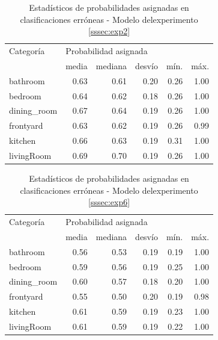 \begin{table}[h!]
	\centering
	\begin{tabular}{| l | rrrrr| }
		\toprule
		Categoría & \multicolumn{5}{l}{Probabilidad asignada} \\
		&         media & mediana &   desvío &   mín. &   máx. \\
		\midrule
		bathroom &         0.63 &   0.61 &  0.20 &  0.26 &  1.00 \\
		bedroom &         0.64 &   0.62 &  0.18 &  0.26 &  1.00 \\
		dining\_room &         0.67 &   0.64 &  0.19 &  0.26 &  1.00 \\
		frontyard &         0.63 &   0.62 &  0.19 &  0.26 &  0.99 \\
		kitchen &         0.66 &   0.63 &  0.19 &  0.31 &  1.00 \\
		livingRoom &         0.69 &   0.70 &  0.19 &  0.26 &  1.00 \\
		\bottomrule
	\end{tabular}
	\caption{Estadísticos de probabilidades asignadas en clasificaciones erróneas - Modelo delexperimento \ref{sssec:exp2}}
	\label{conclusiones:error_analysis_pred_proba_stats:exp2}
\end{table}

\begin{table}[h!]
	\centering
	\begin{tabular}{| l | rrrrr | }
		\toprule
		Categoría & \multicolumn{5}{l}{Probabilidad asignada} \\
		&         media & mediana &   desvío &   mín. &   máx. \\
		\midrule
		bathroom &         0.56 &   0.53 &  0.19 &  0.19 &  1.00 \\
		bedroom &         0.59 &   0.56 &  0.19 &  0.25 &  1.00 \\
		dining\_room &         0.60 &   0.57 &  0.18 &  0.20 &  1.00 \\
		frontyard &         0.55 &   0.50 &  0.20 &  0.19 &  0.98 \\
		kitchen &         0.61 &   0.59 &  0.19 &  0.23 &  1.00 \\
		livingRoom &         0.61 &   0.59 &  0.19 &  0.22 &  1.00 \\
		\bottomrule
	\end{tabular}
	\caption{Estadísticos de probabilidades asignadas en clasificaciones erróneas - Modelo delexperimento \ref{sssec:exp6}}
	\label{conclusiones:error_analysis_pred_proba_stats:exp6}
\end{table}

